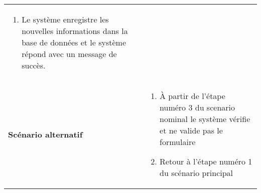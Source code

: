 \begin{longtable}{p{4cm} p{9cm}}
\begin{enumerate}[leftmargin=*]
                                \item Le système enregistre les nouvelles informations
                                dans la base de données et le
                                système répond avec un message de succès.
                            \end{enumerate}
                    \\
                        \textbf{Scénario alternatif} &
                            \begin{enumerate}[leftmargin=*]
                                \item À partir de l’étape numéro 3 du scenario nominal
                                le système vérifie et ne valide pas le formulaire
                                \item Retour à l’étape numéro 1 du scénario principal
                            \end{enumerate}
                \\\bottomrule
            \end{longtable}

